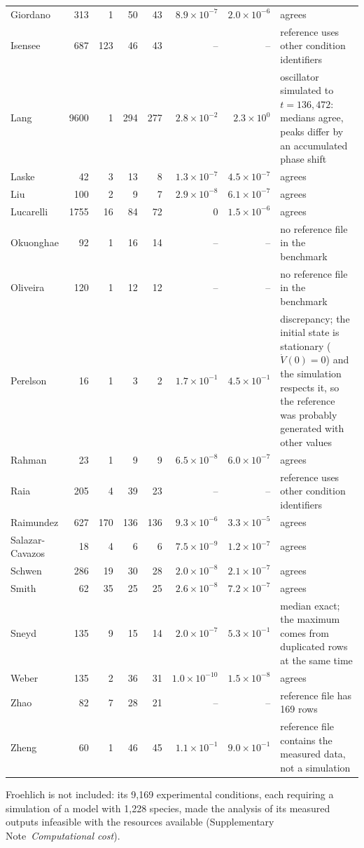 {\begin{longtable}{@{}>{\raggedright\arraybackslash}p{2.6cm}rrrrrr>{\raggedright\arraybackslash}p{5.3cm}@{}}
Giordano & 313 & 1 & 50 & 43 & $8.9\times10^{-7}$ & $2.0\times10^{-6}$ & agrees \\
Isensee & 687 & 123 & 46 & 43 & -- & -- & reference uses other condition identifiers \\
Lang & 9600 & 1 & 294 & 277 & $2.8\times10^{-2}$ & $2.3\times10^{0}$ & oscillator simulated to $t=136{,}472$: medians agree, peaks differ by an accumulated phase shift \\
Laske & 42 & 3 & 13 & 8 & $1.3\times10^{-7}$ & $4.5\times10^{-7}$ & agrees \\
Liu & 100 & 2 & 9 & 7 & $2.9\times10^{-8}$ & $6.1\times10^{-7}$ & agrees \\
Lucarelli & 1755 & 16 & 84 & 72 & $0$ & $1.5\times10^{-6}$ & agrees \\
Okuonghae & 92 & 1 & 16 & 14 & -- & -- & no reference file in the benchmark \\
Oliveira & 120 & 1 & 12 & 12 & -- & -- & no reference file in the benchmark \\
Perelson & 16 & 1 & 3 & 2 & $1.7\times10^{-1}$ & $4.5\times10^{-1}$ & discrepancy; the initial state is stationary ($\dot V(0)=0$) and the simulation respects it, so the reference was probably generated with other values \\
Rahman & 23 & 1 & 9 & 9 & $6.5\times10^{-8}$ & $6.0\times10^{-7}$ & agrees \\
Raia & 205 & 4 & 39 & 23 & -- & -- & reference uses other condition identifiers \\
Raimundez & 627 & 170 & 136 & 136 & $9.3\times10^{-6}$ & $3.3\times10^{-5}$ & agrees \\
Salazar-Cavazos & 18 & 4 & 6 & 6 & $7.5\times10^{-9}$ & $1.2\times10^{-7}$ & agrees \\
Schwen & 286 & 19 & 30 & 28 & $2.0\times10^{-8}$ & $2.1\times10^{-7}$ & agrees \\
Smith & 62 & 35 & 25 & 25 & $2.6\times10^{-8}$ & $7.2\times10^{-7}$ & agrees \\
Sneyd & 135 & 9 & 15 & 14 & $2.0\times10^{-7}$ & $5.3\times10^{-1}$ & median exact; the maximum comes from duplicated rows at the same time \\
Weber & 135 & 2 & 36 & 31 & $1.0\times10^{-10}$ & $1.5\times10^{-8}$ & agrees \\
Zhao & 82 & 7 & 28 & 21 & -- & -- & reference file has 169 rows \\
Zheng & 60 & 1 & 46 & 45 & $1.1\times10^{-1}$ & $9.0\times10^{-1}$ & reference file contains the measured data, not a simulation \\
\bottomrule \end{longtable}}

Froehlich is not included: its 9,169 experimental conditions, each requiring a simulation of a model with 1,228 species, made the analysis of its measured outputs infeasible with the resources available (Supplementary Note~\emph{Computational cost}).

